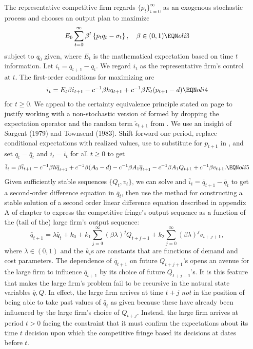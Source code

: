  The representative competitive firm regards $\{p_t\}_{t=0}^\infty$
as an exogenous  stochastic process and chooses
an output plan to
maximize
$$ E_0 \sum_{t=0}^\infty \beta^t \left\{
 p_t q_t - \sigma_t
 \right\}, \quad \beta \in(0,1) \EQN oli3 $$
subject to $q_0$ given, where  %
$E_t$ is the mathematical expectation based on time
$t$ information.
Let $i_t = q_{t+1} - q_t.$  We
regard $i_t$ as the representative firm's control at $t$.  The
first-order conditions
 for maximizing  are
$$  i_t =  E_t  \beta i_{t+1} -c^{-1} \beta h  q_{t+1}
  + c^{-1} \beta  E_t( p_{t+1} -d) \EQN oli4   $$
for $t \geq 0$.
We appeal to the  certainty equivalence principle stated on
page  to justify working with
a non-stochastic version of  formed by dropping
the expectation operator and the random term $\check \epsilon_{t+1}$
from .   We use
an insight  of Sargent (1979) and Townsend
(1983).
  Shift   forward one period, replace conditional
expectations with realized values,  use  to  substitute
for $p_{t+1}$ in  , and set $q_t = \overline q_t$  and $i_t = \overline i_t$ for all
$t\geq 0$  to get
$$ \overline i_t = \beta \overline  i_{t+1}  - c^{-1} \beta h \overline q_{t+1}
 + c^{-1} \beta (A_0-d) - c^{-1} \beta    A_1 \overline q_{t+1}
  -  c^{-1} \beta    A_1 Q_{t+1} + c^{-1} \beta    v_{t+1}. \EQN oli5 $$
Given sufficiently stable sequences $\{Q_t, v_t\}$, we can solve 
and $\overline i_t = \overline q_{t+1} - \overline q_t$ to get a second-order difference equation
in $\bar q_t$, then use the method  for constructing a stable solution
of a second order linear difference equation described  in appendix A of chapter   to
express the competitive fringe's
output sequence  as a function of the (tail of the)
large firm's output sequence:
$$ \bar q_{t+1} = \lambda \bar q_t +k_0 + k_1 \sum_{j=0}^\infty (\beta \lambda)^j Q_{t+j+1} + k_2 \sum_{j=0}^\infty (\beta \lambda)^j v_{t+j+1} , $$
where $\lambda \in (0,1)$ and the $k_i$s  are constants that are functions of demand and cost parameters.
The dependence of $\bar q_{t+1}$ on future $Q_{t+j+1}$'s opens an avenue for the large firm to influence $\bar q_{t+1}$ by its choice
of  future $Q_{t+j+1}$'s.
  It is this feature that makes the  large firm's problem fail  to be
recursive in the natural state variables $\overline q, Q$. In effect, the large firm arrives
at time $t+j$ {\it not\/} in the position of being able to take past values of $\bar q_t$ as given because these have already
been influenced by the large firm's choice of $Q_{t+j}$.  Instead, the large firm
arrives at period $t >0$  facing the  constraint that it must
 confirm the expectations about its time $t$ decision
upon which the competitive fringe   based its decisions at dates
before $t$.

